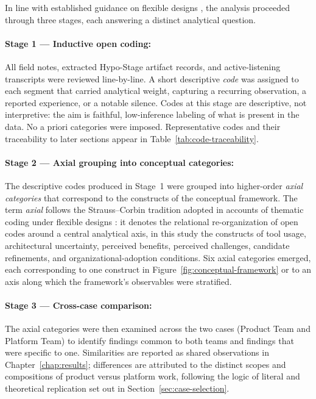 In line with established guidance on flexible designs \citep{robson2016}, the analysis proceeded
through three stages, each answering a distinct analytical question.

\paragraph{Stage 1 --- Inductive open coding:} All field notes, extracted
Hypo-Stage artifact records, and active-listening transcripts were reviewed
line-by-line. A short descriptive \emph{code} was assigned to each segment that carried
analytical weight, capturing a recurring observation, a reported experience,
or a notable silence. Codes at this stage are descriptive, not interpretive:
the aim is faithful, low-inference labeling of what is present in the data.
No a priori categories were imposed. Representative codes and their
traceability to later sections appear in Table~\ref{tab:code-traceability}.

\paragraph{Stage 2 --- Axial grouping into conceptual categories:} The
descriptive codes produced in Stage~1 were grouped into higher-order
\emph{axial categories} that correspond to the constructs of the conceptual
framework. The term \emph{axial} follows the Strauss--Corbin tradition adopted
in accounts of thematic coding under flexible designs \citep{robson2016}: it denotes the relational re-organization of open codes
around a central analytical axis, in this study the constructs of tool usage,
architectural uncertainty, perceived benefits, perceived challenges, candidate
refinements, and organizational-adoption conditions. Six axial categories
emerged, each corresponding to one construct in
Figure~\ref{fig:conceptual-framework} or to an axis along which the
framework's observables were stratified.

\paragraph{Stage 3 --- Cross-case comparison:} The axial categories were then
examined across the two cases (Product Team and Platform Team) to identify
findings common to both teams and findings that were specific to one.
Similarities are reported as shared observations in
Chapter~\ref{chap:results}; differences are attributed to the distinct scopes
and compositions of product versus platform work, following the logic of
literal and theoretical replication set out in
Section~\ref{sec:case-selection}.

